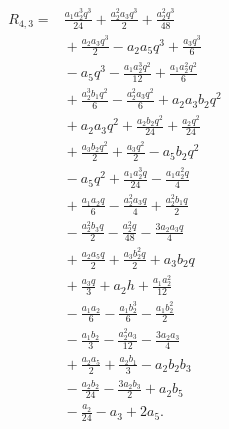 \begin{align*}
R_{4,3}={}& \frac{a_{1} a_{2}^{3} q^{3}}{24} + \frac{a_{2}^{2} a_{3} q^{3}}{2} + \frac{a_{2}^{2} q^{3}}{48}\\
&{}+ \frac{a_{2} a_{3} q^{3}}{2} - a_{2} a_{5} q^{3} + \frac{a_{3} q^{3}}{6}\\
&{}- a_{5} q^{3} - \frac{a_{1} a_{2}^{3} q^{2}}{12} + \frac{a_{1} a_{2}^{2} q^{2}}{6}\\
&{}+ \frac{a_{2}^{3} b_{1} q^{2}}{6} - \frac{a_{2}^{2} a_{3} q^{2}}{6} + a_{2} a_{3} b_{2} q^{2}\\
&{}+ a_{2} a_{3} q^{2} + \frac{a_{2} b_{2} q^{2}}{24} + \frac{a_{2} q^{2}}{24}\\
&{}+ \frac{a_{3} b_{2} q^{2}}{2} + \frac{a_{3} q^{2}}{2} - a_{5} b_{2} q^{2}\\
&{}- a_{5} q^{2} + \frac{a_{1} a_{2}^{3} q}{24} - \frac{a_{1} a_{2}^{2} q}{4}\\
&{}+ \frac{a_{1} a_{2} q}{6} - \frac{a_{2}^{2} a_{3} q}{4} + \frac{a_{2}^{2} b_{1} q}{2}\\
&{}- \frac{a_{2}^{2} b_{3} q}{2} - \frac{a_{2}^{2} q}{48} - \frac{3 a_{2} a_{3} q}{4}\\
&{}+ \frac{a_{2} a_{5} q}{2} + \frac{a_{3} b_{2}^{2} q}{2} + a_{3} b_{2} q\\
&{}+ \frac{a_{3} q}{3} + a_{2} h + \frac{a_{1} a_{2}^{2}}{12}\\
&{}- \frac{a_{1} a_{2}}{6} - \frac{a_{1} b_{2}^{3}}{6} - \frac{a_{1} b_{2}^{2}}{2}\\
&{}- \frac{a_{1} b_{2}}{3} - \frac{a_{2}^{2} a_{3}}{12} - \frac{3 a_{2} a_{3}}{4}\\
&{}+ \frac{a_{2} a_{5}}{2} + \frac{a_{2} b_{1}}{3} - a_{2} b_{2} b_{3}\\
&{}- \frac{a_{2} b_{2}}{24} - \frac{3 a_{2} b_{3}}{2} + a_{2} b_{5}\\
&{}- \frac{a_{2}}{24} - a_{3} + 2 a_{5}.
\end{align*}

